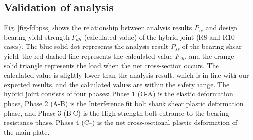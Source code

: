 \subsection{Validation of analysis}

Fig. \ref{fig-fdbpss} shows the relationship between analysis results $P_{ss}$ and design bearing yield strength $F_{dh}$ (calculated value) of the hybrid joint (R8 and R10 cases). The blue solid dot represents the analysis result $P_{ss}$ of the bearing shear yield, the red dashed line represents the calculated value $F_{dh}$, and the orange solid triangle represents the load when the net cross-section occurs. The calculated value is slightly lower than the analysis result, which is in line with our expected results, and the calculated values are within the safety range. The hybrid joint consists of four phases: Phase 1 (O-A) is the elastic deformation phase, Phase 2 (A-B) is the Interference fit bolt shank shear plastic deformation phase, and Phase 3 (B-C) is the High-strength bolt entrance to the bearing-resistance phase. Phase 4 (C–) is the net cross-sectional plastic deformation of the main plate. 

